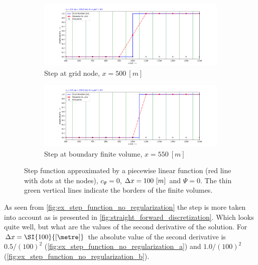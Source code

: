 \begin{figure}[H]
    \centering
    \begin{subfigure}[t]{0.49\textwidth}
        \centering
        \includegraphics[width=1.0\textwidth]{figures/regul_1_1d_step_function_dx100.0_cpsi1e-06.pdf}
        \caption{Step at grid node, $x = 500\ [m]$}\label{fig:ex_step_function_no_regularization_a}
    \end{subfigure}
    \hfill
    \begin{subfigure}[t]{0.49\textwidth}
        \centering
        \includegraphics[width=1.0\textwidth]{figures/regul_2_1d_step_function_dx100.0_cpsi1e-06.pdf}
        \caption{Step at boundary finite volume, $x = 550\ [m]$}\label{fig:ex_step_function_no_regularization_b}
    \end{subfigure}
    \caption{Step function approximated by a piecewise linear function (red line with dots at the nodes), $c_{\Psi} = 0$, $\Delta x = 100\ [m]$ and $\Psi = 0$. The thin green vertical lines indicate the  borders of the finite volumes. \label{fig:ex_step_function_no_regularization}}
\end{figure}
As seen from  \autoref{fig:ex_step_function_no_regularization} the step is more taken into account as is presented in \autoref{fig:straight_forward_discretization}.
Which looks quite well, but what are the values of the second derivative of the solution.
For $\Dx=\SI{100}{[\metre]}$ the absolute value of the second derivative is $0.5/(100)^2$ (\autoref{fig:ex_step_function_no_regularization_a}) and $1.0/(100)^2$ (\autoref{fig:ex_step_function_no_regularization_b}).



